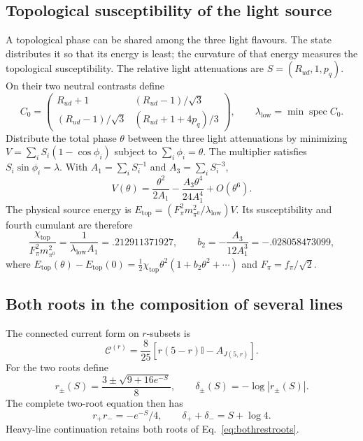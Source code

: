 \documentclass[aps,prx,onecolumn,10pt,notitlepage,nofootinbib,longbibliography]{revtex4-2}
\numberwithin{equation}{section}
\numberwithin{table}{section}
\newcommand{\Id}{\mathbb I}
\begin{document}
\subsection{Topological susceptibility of the light source}
A topological phase can be shared among the three light flavours. The state distributes it so that its energy is least; the curvature of that energy measures the topological susceptibility. The relative light attenuations are $S=(R_{ud},1,p_q)$. On their two neutral contrasts define
\begin{equation}
 C_0=\begin{pmatrix}
 R_{ud}+1&(R_{ud}-1)/\sqrt3\\
 (R_{ud}-1)/\sqrt3&(R_{ud}+1+4p_q)/3
 \end{pmatrix},\qquad
 \lambda_{\mathrm{low}}=\min\operatorname{spec}C_0.
\end{equation}
Distribute the total phase $\theta$ between the three light attenuations by minimizing
$V=\sum_iS_i(1-\cos\phi_i)$ subject to $\sum_i\phi_i=\theta$. The multiplier satisfies $S_i\sin\phi_i=\lambda$. With $A_1=\sum_iS_i^{-1}$ and $A_3=\sum_iS_i^{-3}$,
\begin{equation}
 V(\theta)=\frac{\theta^2}{2A_1}
 -\frac{A_3\theta^4}{24A_1^4}+O(\theta^6).
\end{equation}
The physical source energy is $E_{\mathrm{top}}=(F_\pi^2m_{\pi^0}^2/\lambda_{\mathrm{low}})V$. Its susceptibility and fourth cumulant are therefore
\begin{equation}
 \frac{\chi_{\mathrm{top}}}{F_\pi^2m_{\pi^0}^2}
 =\frac1{\lambda_{\mathrm{low}}A_1}=.212911371927,\qquad
 b_2=-\frac{A_3}{12A_1^3}=-.028058473099,\label{eq:topology}
\end{equation}
where $E_{\mathrm{top}}(\theta)-E_{\mathrm{top}}(0)
=\frac12\chi_{\mathrm{top}}\theta^2(1+b_2\theta^2+\cdots)$ and $F_\pi=f_\pi/\sqrt2$.

\subsection{Both roots in the composition of several lines}
\label{sec:manyreference}
The connected current form on $r$-subsets is
\begin{equation}
 \mathcal C^{(r)}=\frac8{25}[r(5-r)\Id-A_{J(5,r)}].
 \label{eq:manycurrent}
\end{equation}
For the two roots define
\begin{equation}
 r_\pm(S)=\frac{3\pm\sqrt{9+16e^{-S}}}{8},\qquad
 \delta_\pm(S)=-\log|r_\pm(S)|.
\end{equation}
The complete two-root equation then has
\begin{equation}
 r_+r_-=-e^{-S}/4,\qquad \delta_++\delta_-=S+\log4.
 \label{eq:bothrestroots}
\end{equation}
Heavy-line continuation
retains both roots of Eq.~\eqref{eq:bothrestroots}. 
\end{document}
